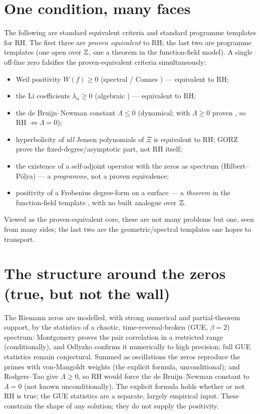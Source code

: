 \documentclass[11pt]{article}
\begin{document}
\section{One condition, many faces}
The following are standard equivalent criteria and standard programme templates for
RH. The first three are \emph{proven equivalent} to RH; the last two are programme
templates (one open over $\mathbb{Z}$, one a theorem in the function-field model). A single
off-line zero falsifies the proven-equivalent criteria simultaneously:
\begin{itemize}\itemsep1pt
  \item Weil positivity $W(f)\ge 0$ (spectral / Connes \cite{Connes}) --- equivalent
        to RH;
  \item the Li coefficients $\lambda_n\ge 0$ (algebraic \cite{Li}) --- equivalent to
        RH;
  \item the de Bruijn--Newman constant $\Lambda\le 0$ (dynamical; with
        $\Lambda\ge 0$ proven \cite{RodgersTao}, so RH $\iff \Lambda=0$);
  \item hyperbolicity of \emph{all} Jensen polynomials of $\Xi$ is equivalent to RH;
        GORZ \cite{GORZ} prove the fixed-degree/asymptotic part, not RH itself;
  \item the existence of a self-adjoint operator with the zeros as spectrum
        (Hilbert--P\'olya) --- a \emph{programme}, not a proven equivalence;
  \item positivity of a Frobenius degree-form on a surface --- a \emph{theorem} in
        the function-field template \cite{Weil2,Deligne}, with no built analogue over
        $\mathbb{Z}$.
\end{itemize}
Viewed as the proven-equivalent core, these are not many problems but one, seen from
many sides; the last two are the geometric/spectral templates one hopes to transport.

\section{The structure around the zeros (true, but not the wall)}
The Riemann zeros are modelled, with strong numerical and partial-theorem support, by
the statistics of a chaotic, time-reversal-broken (GUE, $\beta=2$) spectrum: Montgomery
\cite{Montgomery} proves the pair correlation in a restricted range (conditionally),
and Odlyzko \cite{Odlyzko} confirms it numerically to high precision; full GUE
statistics remain conjectural. Summed as oscillations the zeros reproduce the primes
with von-Mangoldt weights (the explicit formula, unconditional); and Rodgers--Tao give
$\Lambda\ge 0$, so RH would force the de Bruijn--Newman constant to $\Lambda=0$ (not
known unconditionally). The explicit formula holds whether or not RH is true; the GUE
statistics are a separate, largely empirical input. These constrain the shape of any
solution; they do not supply the positivity.
\end{document}
